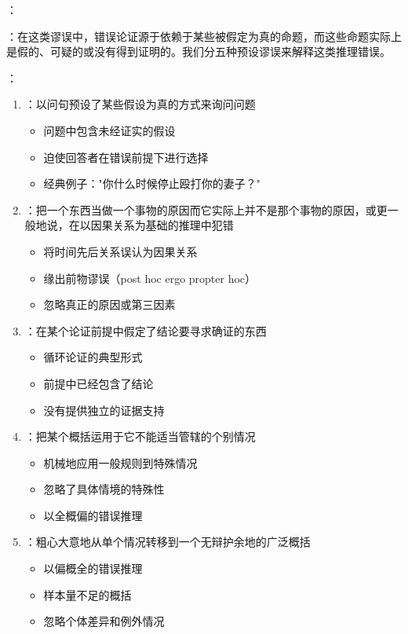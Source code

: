 ：
\begin{theorembox}[title=预设谬误的特征与类型]
：在这类谬误中，错误论证源于依赖于某些被假定为真的命题，而这些命题实际上是假的、可疑的或没有得到证明的。我们分五种预设谬误来解释这类推理错误。

：
\begin{enumerate}
  \item {}：以问句预设了某些假设为真的方式来询问问题
  \begin{itemize}
    \item 问题中包含未经证实的假设
    \item 迫使回答者在错误前提下进行选择
    \item 经典例子："你什么时候停止殴打你的妻子？"
  \end{itemize}

  \item {}：把一个东西当做一个事物的原因而它实际上并不是那个事物的原因，或更一般地说，在以因果关系为基础的推理中犯错
  \begin{itemize}
    \item 将时间先后关系误认为因果关系
    \item 缘出前物谬误（post hoc ergo propter hoc）
    \item 忽略真正的原因或第三因素
  \end{itemize}

  \item {}：在某个论证前提中假定了结论要寻求确证的东西
  \begin{itemize}
    \item 循环论证的典型形式
    \item 前提中已经包含了结论
    \item 没有提供独立的证据支持
  \end{itemize}

  \item {}：把某个概括运用于它不能适当管辖的个别情况
  \begin{itemize}
    \item 机械地应用一般规则到特殊情况
    \item 忽略了具体情境的特殊性
    \item 以全概偏的错误推理
  \end{itemize}

  \item {}：粗心大意地从单个情况转移到一个无辩护余地的广泛概括
  \begin{itemize}
    \item 以偏概全的错误推理
    \item 样本量不足的概括
    \item 忽略个体差异和例外情况
  \end{itemize}
\end{enumerate}


\end{theorembox}
